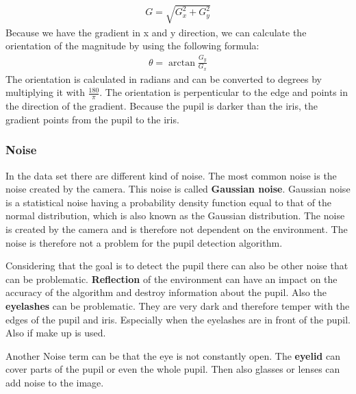       \begin{equation}
        \label{eq:magnitude}
        \begin{split}
          G = \sqrt{G_x^2 + G_y^2}
        \end{split}
      \end{equation}
      Because we have the gradient in x and y direction, we can calculate the orientation of the magnitude by using the following formula: 
      \begin{equation}
        \label{eq:orientation}
        \begin{split}
          \theta  = \arctan{\frac{G_y}{G_x}}
        \end{split}
      \end{equation}
      The orientation is calculated in radians and can be converted to degrees by multiplying it with $\frac{180}{\pi}$. The orientation is perpenticular to the edge and points in the direction of the gradient. Because the pupil is darker than the iris, the gradient points from the pupil to the iris. 

    \subsubsection{Noise}
      In the data set there are different kind of noise. The most common noise is the noise created by the camera. This noise is called \textbf{Gaussian noise}. Gaussian noise is a statistical noise having a probability density function equal to that of the normal distribution, which is also known as the Gaussian distribution. The noise is created by the camera and is therefore not dependent on the environment. The noise is therefore not a problem for the pupil detection algorithm.

      Considering that the goal is to detect the pupil there can also be other noise that can be problematic. \textbf{Reflection} of the environment can have an impact on the accuracy of the algorithm and destroy information about the pupil. Also the \textbf{eyelashes} can be problematic. They are very dark and therefore temper with the edges of the pupil and iris. Especially when the eyelashes are in front of the pupil. Also if make up is used. 

      Another Noise term can be that the eye is not constantly open. The \textbf{eyelid} can cover parts of the pupil or even the whole pupil. Then also glasses or lenses can add noise to the image. 